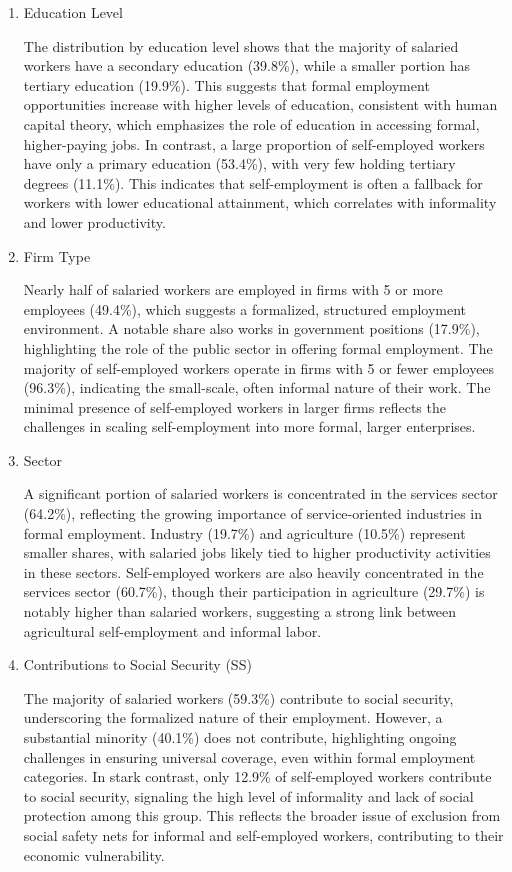 \documentclass[english]{article}
\begin{document}
\begin{enumerate}
\begin{figure}[h!tbp]
\end{figure}

\begin{enumerate}
\item Education Level

The distribution by education level shows that the majority of salaried workers have a secondary education (39.8\%), while a smaller portion has tertiary education (19.9\%). This suggests that formal employment opportunities increase with higher levels of education, consistent with human capital theory, which emphasizes the role of education in accessing formal, higher-paying jobs. In contrast, a large proportion of self-employed workers have only a primary education (53.4\%), with very few holding tertiary degrees (11.1\%). This indicates that self-employment is often a fallback for workers with lower educational attainment, which correlates with informality and lower productivity.

\item Firm Type

Nearly half of salaried workers are employed in firms with 5 or more employees (49.4\%), which suggests a formalized, structured employment environment. A notable share also works in government positions (17.9\%), highlighting the role of the public sector in offering formal employment. The majority of self-employed workers operate in firms with 5 or fewer employees (96.3\%), indicating the small-scale, often informal nature of their work. The minimal presence of self-employed workers in larger firms reflects the challenges in scaling self-employment into more formal, larger enterprises.

\item Sector

A significant portion of salaried workers is concentrated in the services sector (64.2\%), reflecting the growing importance of service-oriented industries in formal employment. Industry (19.7\%) and agriculture (10.5\%) represent smaller shares, with salaried jobs likely tied to higher productivity activities in these sectors. Self-employed workers are also heavily concentrated in the services sector (60.7\%), though their participation in agriculture (29.7\%) is notably higher than salaried workers, suggesting a strong link between agricultural self-employment and informal labor.

\item Contributions to Social Security (SS)

The majority of salaried workers (59.3\%) contribute to social security, underscoring the formalized nature of their employment. However, a substantial minority (40.1\%) does not contribute, highlighting ongoing challenges in ensuring universal coverage, even within formal employment categories. In stark contrast, only 12.9\% of self-employed workers contribute to social security, signaling the high level of informality and lack of social protection among this group. This reflects the broader issue of exclusion from social safety nets for informal and self-employed workers, contributing to their economic vulnerability.
\end{enumerate}


\end{enumerate}
\end{document}
